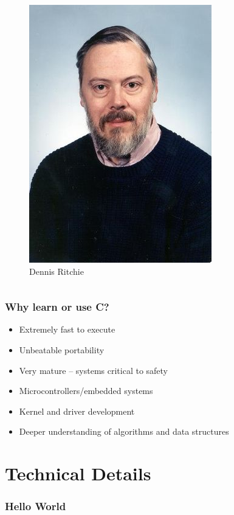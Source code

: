 \documentclass{beamer}
\begin{document}
\begin{frame}
\begin{columns}

        \begin{figure}
            \centering
            \includegraphics[scale=0.5]{dennisritchie.jpg}
            \caption*{Dennis Ritchie}
            \label{fig:ritch}
        \end{figure}
    \end{columns}
\end{frame}

\begin{frame}
    \frametitle{Why learn or use C?}
    \begin{itemize}[<+->]
        \item Extremely fast to execute
        \item Unbeatable portability
        \item Very mature -- systems critical to safety
        \item Microcontrollers/embedded systems
        \item Kernel and driver development
        \item Deeper understanding of algorithms and data structures
    \end{itemize}
\end{frame}

\section{Technical Details}

\begin{frame}
    \frametitle{Hello World}
    \begin{figure}
        
    \end{figure}
\end{frame}
\end{document}
